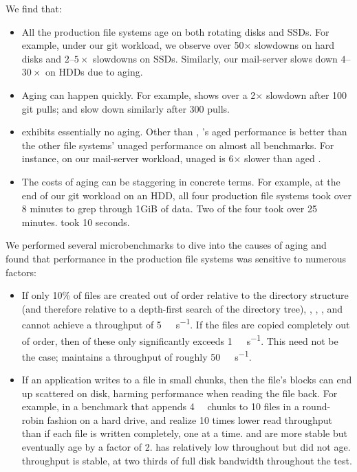 We find that:
\begin{itemize}
\item All the production file systems age on both rotating disks and
  SSDs.  For example, under our git workload, we observe over
  50$\times$ slowdowns on hard disks and $2$--$5\times$ slowdowns on
  SSDs.  Similarly, our mail-server slows down $4$--$30\times$ 
  on HDDs due to aging.
\item Aging can happen quickly.  For example, \ext shows over a
  2$\times$ slowdown after 100 git pulls;
  \btrfs and \zfs slow down similarly after 300 pulls.
\item \betrfs exhibits essentially no aging.  
  Other than \btrfs, 
  \betrfs's aged performance is better than the other file systems'
  unaged performance on almost all benchmarks.
  For instance, on our mail-server workload, unaged \ext is 6$\times$ slower
  than aged \betrfs.
%
\item The costs of aging can be staggering in concrete terms.  For
  example, at the end of our git workload on an HDD, all four
  production file systems took over \num{8} minutes to
  grep through 1GiB of data.  Two of the four
  took over \num{25} minutes. \betrfs took \num{10} seconds.
\end{itemize}
%
We performed several microbenchmarks to dive into the causes of aging and
found that performance in the production file systems was sensitive to numerous
factors:

\begin{itemize} \item If only 10\% of files are created out of order
		relative to the directory structure (and therefore relative to a
		depth-first search of the directory tree), \btrfs, \ext, \ftwofs, \xfs
		and \zfs cannot achieve a throughput of
                \SI{5}{\mebi\byte\per\second}. If the files are copied completely out
		of order, then of these only \xfs significantly exceeds
                \SI{1}{\mebi\byte\per\second}. This need not be the case; \betrfs
                maintains a throughput of roughly \SI{50}{\mebi\byte\per\second}.
	\item If an application writes to a file in small chunks, then the file's
		blocks can end up scattered on disk, harming performance when reading
		the file back.  For example, in a benchmark that appends
                \SI{4}{\kibi\byte} chunks to 10 files in a round-robin fashion on a
		hard drive, \btrfs and \ftwofs realize 10 times lower read throughput
		than if each file is written completely, one at a time.
		\ext and \xfs are more stable but eventually age by a factor of 2. \zfs
		has relatively low throughout but did not age. \betrfs throughput is
		stable, at two thirds of full disk bandwidth throughout the test.
\end{itemize}
